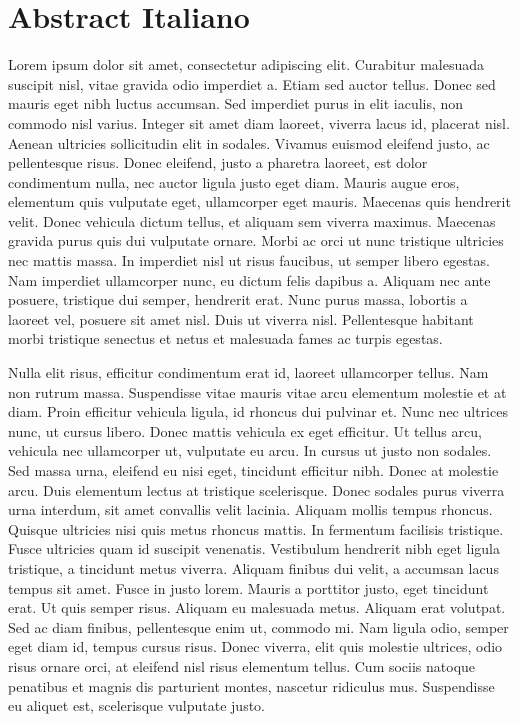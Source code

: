 \chapter{Abstract Italiano}

Lorem ipsum dolor sit amet, consectetur adipiscing elit. Curabitur malesuada suscipit nisl, vitae gravida odio imperdiet a. Etiam sed auctor tellus. Donec sed mauris eget nibh luctus accumsan. Sed imperdiet purus in elit iaculis, non commodo nisl varius. Integer sit amet diam laoreet, viverra lacus id, placerat nisl. Aenean ultricies sollicitudin elit in sodales. Vivamus euismod eleifend justo, ac pellentesque risus. Donec eleifend, justo a pharetra laoreet, est dolor condimentum nulla, nec auctor ligula justo eget diam. Mauris augue eros, elementum quis vulputate eget, ullamcorper eget mauris.
Maecenas quis hendrerit velit. Donec vehicula dictum tellus, et aliquam sem viverra maximus. Maecenas gravida purus quis dui vulputate ornare. Morbi ac orci ut nunc tristique ultricies nec mattis massa. In imperdiet nisl ut risus faucibus, ut semper libero egestas. Nam imperdiet ullamcorper nunc, eu dictum felis dapibus a. Aliquam nec ante posuere, tristique dui semper, hendrerit erat. Nunc purus massa, lobortis a laoreet vel, posuere sit amet nisl. Duis ut viverra nisl. Pellentesque habitant morbi tristique senectus et netus et malesuada fames ac turpis egestas.

Nulla elit risus, efficitur condimentum erat id, laoreet ullamcorper tellus. Nam non rutrum massa. Suspendisse vitae mauris vitae arcu elementum molestie et at diam. Proin efficitur vehicula ligula, id rhoncus dui pulvinar et. Nunc nec ultrices nunc, ut cursus libero. Donec mattis vehicula ex eget efficitur. Ut tellus arcu, vehicula nec ullamcorper ut, vulputate eu arcu. In cursus ut justo non sodales. Sed massa urna, eleifend eu nisi eget, tincidunt efficitur nibh. Donec at molestie arcu. Duis elementum lectus at tristique scelerisque. Donec sodales purus viverra urna interdum, sit amet convallis velit lacinia. Aliquam mollis tempus rhoncus. Quisque ultricies nisi quis metus rhoncus mattis.
In fermentum facilisis tristique. Fusce ultricies quam id suscipit venenatis. Vestibulum hendrerit nibh eget ligula tristique, a tincidunt metus viverra. Aliquam finibus dui velit, a accumsan lacus tempus sit amet. Fusce in justo lorem. Mauris a porttitor justo, eget tincidunt erat. Ut quis semper risus. Aliquam eu malesuada metus. Aliquam erat volutpat. Sed ac diam finibus, pellentesque enim ut, commodo mi. Nam ligula odio, semper eget diam id, tempus cursus risus. Donec viverra, elit quis molestie ultrices, odio risus ornare orci, at eleifend nisl risus elementum tellus. Cum sociis natoque penatibus et magnis dis parturient montes, nascetur ridiculus mus. Suspendisse eu aliquet est, scelerisque vulputate justo.

